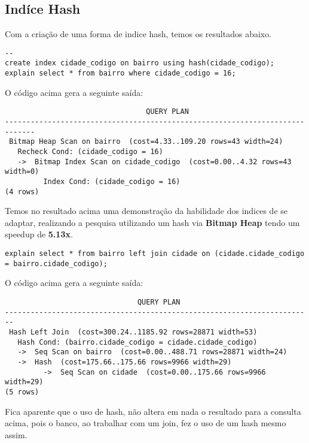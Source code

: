 \documentclass[12pt, a4paper, twoside, titlepage]{article}
\begin{document}
\subsection{Indíce Hash}
Com a criação de uma forma de indice hash, temos os resultados abaixo.
\begin{lstlisting}
--
create index cidade_codigo on bairro using hash(cidade_codigo);
explain select * from bairro where cidade_codigo = 16;
\end{lstlisting}
O código acima gera a seguinte saída: 
\begin{lstlisting}
                                 QUERY PLAN
-----------------------------------------------------------------------------
 Bitmap Heap Scan on bairro  (cost=4.33..109.20 rows=43 width=24)
   Recheck Cond: (cidade_codigo = 16)
   ->  Bitmap Index Scan on cidade_codigo  (cost=0.00..4.32 rows=43 width=0)
         Index Cond: (cidade_codigo = 16)
(4 rows)
\end{lstlisting}
Temos no resultado acima uma demonstração da habilidade dos indices de se adaptar, realizando a pesquisa utilizando um hash via \textbf{Bitmap Heap} tendo um speedup de \textbf{5.13x}.
\begin{lstlisting}
explain select * from bairro left join cidade on (cidade.cidade_codigo = bairro.cidade_codigo);
\end{lstlisting}
O código acima gera a seguinte saída: 
\begin{lstlisting}
                               QUERY PLAN
------------------------------------------------------------------------
 Hash Left Join  (cost=300.24..1185.92 rows=28871 width=53)
   Hash Cond: (bairro.cidade_codigo = cidade.cidade_codigo)
   ->  Seq Scan on bairro  (cost=0.00..488.71 rows=28871 width=24)
   ->  Hash  (cost=175.66..175.66 rows=9966 width=29)
         ->  Seq Scan on cidade  (cost=0.00..175.66 rows=9966 width=29)
(5 rows)

\end{lstlisting}
Fica aparente que o uso de hash, não altera em nada o resultado para a consulta acima, pois o banco, ao trabalhar com um join, fez o uso de um hash mesmo assim.
\end{document}
